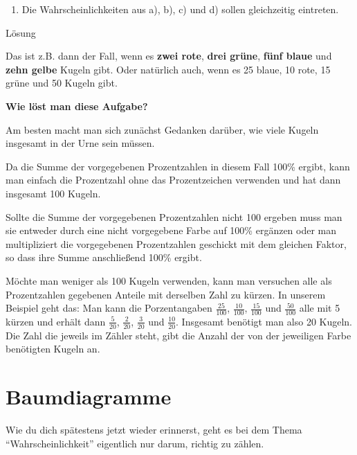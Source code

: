 \documentclass[
  ngerman,
]{book}
\providecommand{\tightlist}{%
  \setlength{\itemsep}{0pt}\setlength{\parskip}{0pt}}
\begin{document}
\begin{enumerate}
\def\labelenumi{\alph{enumi})}
\setcounter{enumi}{4}
\tightlist
\item
  Die Wahrscheinlichkeiten aus a), b), c) und d) sollen gleichzeitig eintreten.
\end{enumerate}

Lösung

Das ist z.B. dann der Fall, wenn es \textbf{zwei rote}, \textbf{drei grüne}, \textbf{fünf blaue} und \textbf{zehn gelbe} Kugeln gibt. Oder natürlich auch, wenn es 25 blaue, 10 rote, 15 grüne und 50 Kugeln gibt.

\textbf{Wie löst man diese Aufgabe?}

Am besten macht man sich zunächst Gedanken darüber, wie viele Kugeln insgesamt in der Urne sein müssen.

Da die Summe der vorgegebenen Prozentzahlen in diesem Fall 100\% ergibt, kann man einfach die Prozentzahl ohne das Prozentzeichen verwenden und hat dann insgesamt 100 Kugeln.

Sollte die Summe der vorgegebenen Prozentzahlen nicht 100 ergeben muss man sie entweder durch eine nicht vorgegebene Farbe auf 100\% ergänzen oder man multipliziert die vorgegebenen Prozentzahlen geschickt mit dem gleichen Faktor, so dass ihre Summe anschließend 100\% ergibt.

Möchte man weniger als 100 Kugeln verwenden, kann man versuchen alle als Prozentzahlen gegebenen Anteile mit derselben Zahl zu kürzen. In unserem Beispiel geht das: Man kann die Porzentangaben \(\frac{25}{100}\), \(\frac{10}{100}\), \(\frac{15}{100}\) und \(\frac{50}{100}\) alle mit 5 kürzen und erhält dann \(\frac{5}{20}\), \(\frac{2}{20}\), \(\frac{3}{20}\) und \(\frac{10}{20}\). Insgesamt benötigt man also 20 Kugeln. Die Zahl die jeweils im Zähler steht, gibt die Anzahl der von der jeweiligen Farbe benötigten Kugeln an.

\hypertarget{section-101}{%
\subsubsection*{}\label{section-101}}

\hypertarget{baumdiagramme}{%
\chapter{Baumdiagramme}\label{baumdiagramme}}

Wie du dich spätestens jetzt wieder erinnerst, geht es bei dem Thema ``Wahrscheinlichkeit'' eigentlich nur darum, richtig zu zählen.
\end{document}
